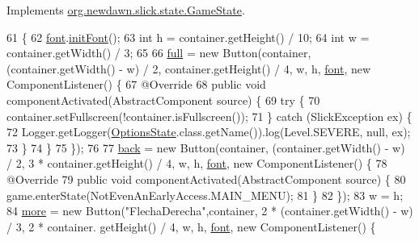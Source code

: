 Implements \mbox{\hyperlink{interfaceorg_1_1newdawn_1_1slick_1_1state_1_1_game_state_aa799a369e0fcfe6822d2d586fa6f5bbc}{org.\+newdawn.\+slick.\+state.\+Game\+State}}.


\begin{DoxyCode}
61                                                                                                      \{
62         \mbox{\hyperlink{classstates_1_1_options_state_a6a6834f7d7a3704e0a42aac50a50ae3f}{font}}.\mbox{\hyperlink{classgui_1_1_g_u_i_font_ae1fccb6783e7c0f11fdcedd36362585d}{initFont}}();
63         \textcolor{keywordtype}{int} h = container.getHeight() / 10;
64         \textcolor{keywordtype}{int} w = container.getWidth() / 3;
65 
66         \mbox{\hyperlink{classstates_1_1_options_state_a904fabe1b3ae80f7ff9ea5a22d0dbc88}{full}} = \textcolor{keyword}{new} Button(container, (container.getWidth() - w) / 2, container.getHeight() / 4, w, h, 
      \mbox{\hyperlink{classstates_1_1_options_state_a6a6834f7d7a3704e0a42aac50a50ae3f}{font}}, \textcolor{keyword}{new} ComponentListener() \{
67             @Override
68             \textcolor{keyword}{public} \textcolor{keywordtype}{void} componentActivated(AbstractComponent source) \{
69                 \textcolor{keywordflow}{try} \{
70                     container.setFullscreen(!container.isFullscreen());
71                 \} \textcolor{keywordflow}{catch} (SlickException ex) \{
72                     Logger.getLogger(\mbox{\hyperlink{classstates_1_1_options_state_a8ececa696cb63624887652040f6f81d6}{OptionsState}}.class.getName()).log(Level.SEVERE, null, ex);
73                 \}
74             \}
75         \});
76 
77         \mbox{\hyperlink{classstates_1_1_options_state_a3126dfa1dd586fed0c1dfd6ab5176e01}{back}} = \textcolor{keyword}{new} Button(container, (container.getWidth() - w) / 2, 3 * container.getHeight() / 4, w, 
      h, \mbox{\hyperlink{classstates_1_1_options_state_a6a6834f7d7a3704e0a42aac50a50ae3f}{font}}, \textcolor{keyword}{new} ComponentListener() \{
78             @Override
79             \textcolor{keyword}{public} \textcolor{keywordtype}{void} componentActivated(AbstractComponent source) \{
80                 game.enterState(NotEvenAnEarlyAccess.MAIN\_MENU);
81             \}
82         \});
83         w = h;
84         \mbox{\hyperlink{classstates_1_1_options_state_a1364460866ca32c9a1b1a53306ff76f9}{more}} = \textcolor{keyword}{new} Button(\textcolor{stringliteral}{"FlechaDerecha"},container, 2 * (container.getWidth() - w) / 3, 2 * container.
      getHeight() / 4, w, h, \mbox{\hyperlink{classstates_1_1_options_state_a6a6834f7d7a3704e0a42aac50a50ae3f}{font}}, \textcolor{keyword}{new} ComponentListener() \{

\end{DoxyCode}
